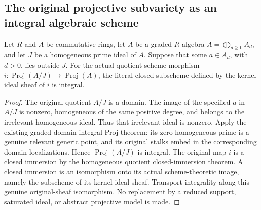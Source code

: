 \subsection{The original projective subvariety as an integral algebraic scheme}

\begin{lemma}\label{lem:original-prime-projective-kernel-integral}
\leanok
Let $R$ and $A$ be commutative rings, let $A$ be a graded $R$-algebra
$A=\bigoplus_{d\geq0}A_d$, and let $J$ be a homogeneous prime ideal of $A$.
Suppose that some $a\in A_d$, with $d>0$, lies outside $J$.
For the actual quotient scheme morphism
$i:\operatorname{Proj}(A/J)\to\operatorname{Proj}(A)$, the literal closed
subscheme defined by the kernel ideal sheaf of $i$ is integral.
\end{lemma}
\begin{proof}
The original quotient $A/J$ is a domain. The image of the specified $a$ in
$A/J$ is nonzero, homogeneous of the same positive degree, and belongs to
the irrelevant homogeneous ideal. Thus that irrelevant ideal is nonzero.
Apply the existing graded-domain integral-Proj theorem: its zero homogeneous
prime is a genuine relevant generic point, and its original stalks embed
in the corresponding domain localizations. Hence $\operatorname{Proj}(A/J)$
is integral. The original map $i$ is a closed immersion by the homogeneous
quotient closed-immersion theorem. A closed immersion is an isomorphism onto
its actual scheme-theoretic image, namely the subscheme of its kernel ideal
sheaf. Transport integrality along this genuine original-sheaf isomorphism.
No replacement by a reduced support, saturated ideal, or abstract projective
model is made.
\end{proof}

